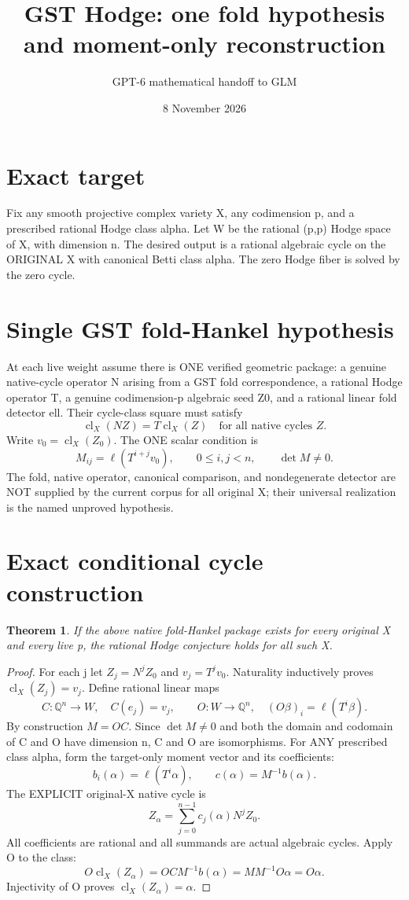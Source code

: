 \documentclass[11pt]{article}
\title{GST Hodge: one fold hypothesis and moment-only reconstruction}
\author{GPT-6 mathematical handoff to GLM}
\date{8 November 2026}
\newtheorem{theorem}{Theorem}
\newcommand{\Q}{\mathbb Q}
\newcommand{\cl}{\operatorname{cl}}
\begin{document}
\maketitle
\section{Exact target}
Fix any smooth projective complex variety X, any codimension p, and a prescribed rational Hodge class alpha. Let W be the rational (p,p) Hodge space of X, with dimension n. The desired output is a rational algebraic cycle on the ORIGINAL X with canonical Betti class alpha. The zero Hodge fiber is solved by the zero cycle.

\section{Single GST fold-Hankel hypothesis}
At each live weight assume there is ONE verified geometric package:
a genuine native-cycle operator N arising from a GST fold correspondence, a rational Hodge operator T, a genuine codimension-p algebraic seed Z0, and a rational linear fold detector ell. Their cycle-class square must satisfy
\[
\cl_X(NZ)=T\cl_X(Z)\quad\text{for all native cycles }Z.
\]
Write \(v_0=\cl_X(Z_0)\). The ONE scalar condition is
\[
M_{ij}=\ell(T^{i+j}v_0),\qquad 0\le i,j<n,\qquad \boxed{\det M\neq0}.
\]
The fold, native operator, canonical comparison, and nondegenerate detector are NOT supplied by the current corpus for all original X; their universal realization is the named unproved hypothesis.

\section{Exact conditional cycle construction}
\begin{theorem}
If the above native fold-Hankel package exists for every original X and every live p, the rational Hodge conjecture holds for all such X.
\end{theorem}
\begin{proof}
For each j let \(Z_j=N^jZ_0\) and \(v_j=T^jv_0\).
Naturality inductively proves \(\cl_X(Z_j)=v_j\).
Define rational linear maps
\[
 C:\Q^n\to W,\quad C(e_j)=v_j,\qquad
 O:W\to\Q^n,\quad (O\beta)_i=\ell(T^i\beta).
\]
By construction \(M=OC\). Since \(\det M\neq0\) and
both the domain and codomain of C and O have dimension n,
C and O are isomorphisms. For ANY prescribed class alpha,
form the target-only moment vector and its coefficients:
\[
 b_i(\alpha)=\ell(T^i\alpha),\qquad c(\alpha)=M^{-1}b(\alpha).
\]
The EXPLICIT original-X native cycle is
\[
 \boxed{Z_\alpha=\sum_{j=0}^{n-1}c_j(\alpha)N^j Z_0.}
\]
All coefficients are rational and all summands are actual algebraic
cycles. Apply O to the class:
\[
 O\cl_X(Z_\alpha)=OCM^{-1}b(\alpha)
 =MM^{-1}O\alpha=O\alpha.
\]
Injectivity of O proves \(\cl_X(Z_\alpha)=\alpha\).
\end{proof}
\end{document}
